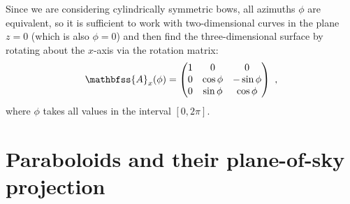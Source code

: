 \documentclass[useAMS, usenatbib, a4paper]{mnras}
\begin{document}
Since we are considering cylindrically symmetric bows, all azimuths
\(\phi\) are equivalent, so it is sufficient to work with two-dimensional
curves in the plane \(z = 0\) (which is also \(\phi = 0\)) and then find
the three-dimensional surface by rotating about the \(x\)-axis via the
rotation matrix:
\begin{equation}
  \label{eq:Rotation-matrix-x}
  \mathbfss{A}_x(\phi) = 
   \begin{pmatrix}
    1 & 0 & 0 \\
    0 &\cos\phi & -\sin\phi \\
    0 &\sin\phi & \cos\phi 
  \end{pmatrix} \ ,
\end{equation}
where \(\phi\) takes all values in the interval \([0, 2\pi]\). 


\section{Paraboloids and their plane-of-sky projection}
\label{app:parabola}
\end{document}

